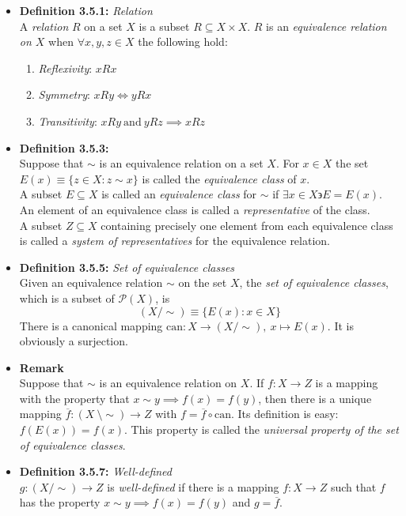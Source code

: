 \documentclass[11pt,a4paper]{article}
\begin{document}
\begin{itemize}

    \item \textbf{Definition 3.5.1:} \emph{Relation} \\
        A \emph{relation} $R$ on a set $X$ is a subset $R \subseteq X \times X$.
        $R$ is an \emph{equivalence relation on $X$} when $\forall x,y,z \in X$ the following hold:
        \begin{enumerate}
            \item \emph{Reflexivity}: $xRx$
            \item \emph{Symmetry}: $xRy \iff yRx$
            \item \emph{Transitivity}: $xRy \ \text{and} \ yRz \implies xRz$
        \end{enumerate}

    \item \textbf{Definition 3.5.3:} \\
        Suppose that $\sim$ is an equivalence relation on a set $X$.
        For $x \in X$ the set $E(x) \equiv \{z \in X : z\sim x\}$ is called the
        \emph{equivalence class} of $x$. \\
        A subset $E \subseteq X$ is called an \emph{equivalence class} for $\sim$ if
        $\exists x \in X \backepsilon E=E(x)$. \\
        An element of an equivalence class is called a \emph{representative} of the class. \\
        A subset $Z \subseteq X$ containing precisely one element from each equivalence class is
        called a \emph{system of representatives} for the equivalence relation.

    \item \textbf{Definition 3.5.5:} \emph{Set of equivalence classes} \\
        Given an equivalence relation $\sim$ on the set $X$, the \emph{set of equivalence classes},
        which is a subset of $\mathcal{P}(X)$, is
        \[
            (X/\sim) \equiv \{E(x) : x \in X\}
        \]
        There is a canonical mapping $\mathrm{can} : X \to (X/\sim), \ x \mapsto E(x)$.
        It is obviously a surjection.

    \item \textbf{Remark} \\
        Suppose that $\sim$ is an equivalence relation on $X$.
        If $f : X \to Z$ is a mapping with the property that $x \sim y \implies f(x) = f(y)$,
        then there is a unique mapping $\overline{f} : (X \ \setminus \sim) \to Z$
        with $f = \overline{f} \circ \mathrm{can}$.
        Its definition is easy: $f(E(x)) = f(x)$.
        This property is called the \emph{universal property of the set of equivalence classes}.

    \item \textbf{Definition 3.5.7:} \emph{Well-defined} \\
        $g : (X/\sim) \to Z$ is \emph{well-defined} if there is a mapping
        $f : X \to Z$ such that $f$ has the property
        $x \sim y \implies f(x) = f(y)$ and $g = \overline{f}$.
\end{itemize}
\end{document}
